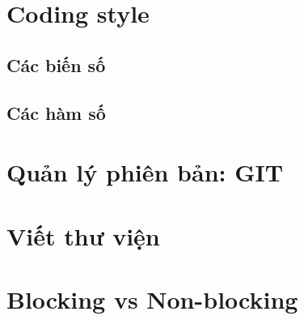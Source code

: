 \documentclass[12pt,a5paper]{book}
\begin{document}
\paragraph{}
\chapter{Coding style}
	\section{Các biến số}
	\section{Các hàm số}
\chapter{Quản lý phiên bản: GIT}
\chapter{Viết thư viện}
\chapter{Blocking vs Non-blocking}
\end{document}
